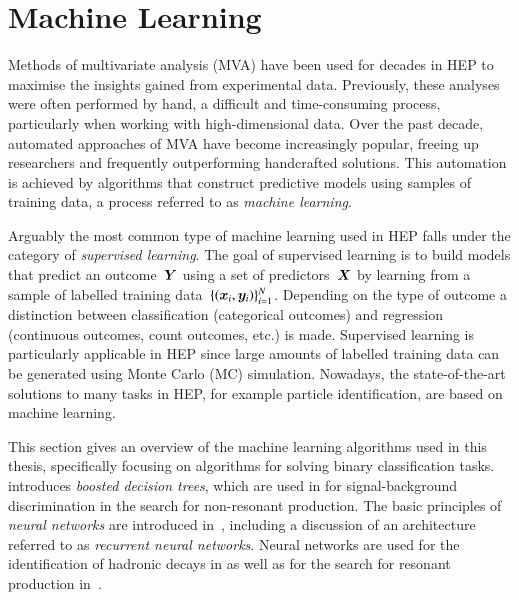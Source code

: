 \section{Machine Learning}%
\label{sec:machine_learning}

Methods of multivariate analysis (MVA) have been used for decades in HEP to
maximise the insights gained from experimental data. Previously, these analyses
were often performed by hand, a difficult and time-consuming process,
particularly when working with high-dimensional data. Over the past decade,
automated approaches of MVA have become increasingly popular, freeing up
researchers and frequently outperforming handcrafted solutions. This automation
is achieved by algorithms that construct predictive models using samples of
training data, a process referred to as \emph{machine learning}.

Arguably the most common type of machine learning used in HEP falls under the
category of \emph{supervised learning}. The goal of supervised learning is to
build models that predict an outcome~$\bm{Y}$ using a set of
predictors~$\bm{X}$ by learning from a sample of labelled training
data~$\{ (\bm{x}_i, \bm{y}_i) \}_{i=1}^{N}$. Depending on the type of
outcome a distinction between classification (categorical outcomes) and
regression (continuous outcomes, count outcomes, etc.) is made. Supervised
learning is particularly applicable in HEP since large amounts of labelled
training data can be generated using Monte Carlo (MC) simulation.
Nowadays, the state-of-the-art solutions to many tasks in HEP, for example
particle identification, are based on machine learning.

This section gives an overview of the machine learning algorithms used in this
thesis, specifically focusing on algorithms for solving binary classification
tasks.  introduces \emph{boosted decision trees}, which are used
in  for signal-background
discrimination in the search for non-resonant \HH production. The basic
principles of \emph{neural networks} are introduced
in~, including a discussion of an architecture
referred to as \emph{recurrent neural networks}. Neural networks are used for
the identification of hadronic \taulepton decays in  as well as
for the search for resonant \HH production in~.


